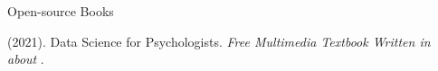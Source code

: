 

\begin{rSection}{\textrm{Open-source Books}}%
\begin{etaremune}
\item  \meb (2021). Data Science for Psychologists. \textit{Free Multimedia Textbook Written in \R about \R}. 

\end{etaremune}\end{rSection}%
